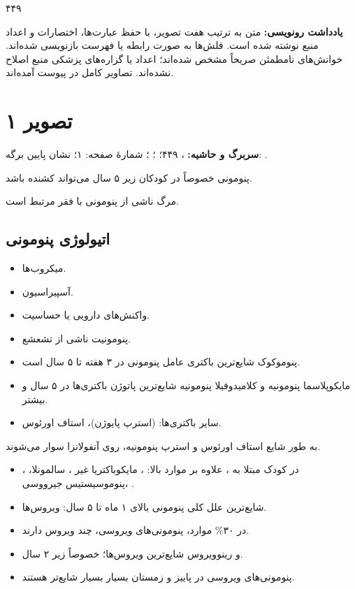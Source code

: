 \documentclass[12pt,a4paper]{article}
\begin{document}
\fi
\providecommand{\CAPunclear}[1]{\textbf{[خوانش نامطمئن: #1]}}
\providecommand{\CAPpage}[2]{\clearpage\section*{تصویر #1}\lr{\texttt{#2}}\par}
\providecommand{\CAPmath}[1]{\lr{\(#1\)}}

\begin{center}
{\Large\bfseries {}}\par
{}\par
۴۴۹
\end{center}
\textbf{یادداشت رونویسی:} متن به ترتیب هفت تصویر، با حفظ عبارت‌ها، اختصارات و اعداد منبع نوشته شده است. فلش‌ها به صورت رابطه یا فهرست بازنویسی شده‌اند. خوانش‌های نامطمئن صریحاً مشخص شده‌اند؛ اعداد یا گزاره‌های پزشکی منبع اصلاح نشده‌اند. تصاویر کامل در پیوست آمده‌اند.

\CAPpage{۱}{pic01.jpg}
\textbf{سربرگ و حاشیه:} ، ۴۴۹؛ ؛ ؛ شمارهٔ صفحه: ۱؛ نشان پایین برگه: .

پنومونی خصوصاً در کودکان زیر ۵ سال می‌تواند کشنده باشد.

مرگ ناشی از پنومونی با فقر مرتبط است.
\subsection*{اتیولوژی پنومونی}
\begin{itemize}
\item میکروب‌ها.
\item آسپیراسیون.
\item واکنش‌های دارویی یا حساسیت.
\item پنومونیت ناشی از تشعشع.
\item پنوموکوک شایع‌ترین باکتری عامل پنومونی در ۳ هفته تا ۵ سال است.
\item مایکوپلاسما پنومونیه و کلامیدوفیلا پنومونیه شایع‌ترین پاتوژن باکتری‌ها در ۵ سال و بیشتر.
\item سایر باکتری‌ها:  (استرپ پایوژن)، استاف اورئوس.
\end{itemize}
به طور شایع استاف اورئوس و استرپ پنومونیه، روی آنفولانزا سوار می‌شوند.
\begin{itemize}
\item در کودک مبتلا به ، علاوه بر موارد بالا: ، مایکوباکتریا غیر ، سالمونلا، ، پنوموسیستیس جیرووسی، .
\item شایع‌ترین علل کلی پنومونی بالای ۱ ماه تا ۵ سال: ویروس‌ها.
\item در ۳۰\% موارد، پنومونی‌های ویروسی، چند ویروس دارند.
\item {} و رینوویروس شایع‌ترین ویروس‌ها؛ خصوصاً زیر ۲ سال.
\item پنومونی‌های ویروسی در پاییز و زمستان بسیار بسیار شایع‌تر هستند.
\end{itemize}
\end{document}
